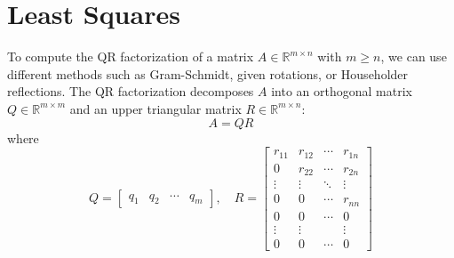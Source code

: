 \documentclass[11pt]{article}
\begin{document}
\pagebreak
\section{Least Squares}
To compute the QR factorization of a matrix \(A \in \mathbb{R}^{m \times n}\) with \(m \geq n\), we can use different methods such as Gram-Schmidt, given rotations, or Householder reflections.
The QR factorization decomposes \(A\) into an orthogonal matrix \(Q \in \mathbb{R}^{m \times m}\) and an upper triangular matrix \(R \in \mathbb{R}^{m \times n}\):
\[A = Q R\]
where
\[Q = \begin{bmatrix}
    q_1 & q_2 & \cdots & q_m
\end{bmatrix}, \quad R = \begin{bmatrix}
    r_{11} & r_{12} & \cdots & r_{1n} \\
    0 & r_{22} & \cdots & r_{2n} \\
    \vdots & \vdots & \ddots & \vdots \\
    0 & 0 & \cdots & r_{nn} \\
    0 & 0 & \cdots & 0 \\
    \vdots & \vdots & & \vdots \\
    0 & 0 & \cdots & 0
\end{bmatrix}\]
\end{document}
